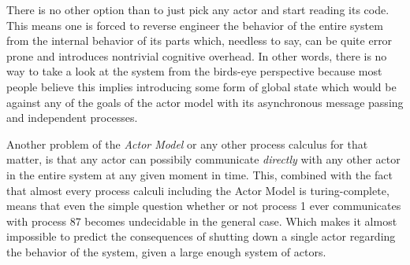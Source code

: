 There is no other option than to just pick any actor and start
reading its code. This means one is forced to reverse engineer the
behavior of the entire system from the internal behavior of its parts
which, needless to say, can be quite error prone and introduces
nontrivial cognitive overhead. In other words, there is no way to
take a look at the system from the birds-eye perspective because
most people believe this implies introducing some form of global
state which would be against any of the goals of the actor model
with its asynchronous message passing and independent processes.
\newline

Another problem of the \textit{Actor Model} or any other process
calculus for that matter, is that any actor can possibily communicate
\textit{directly} with any other actor in the entire system at any
given moment in time. This, combined with the fact that almost every
process calculi including the Actor Model is turing-complete,
means that even the simple question whether or not process 1
ever communicates with process 87 becomes undecidable in the general
case. Which makes it almost impossible to predict the consequences
of shutting down a single actor regarding the behavior of the system,
given a large enough system of actors.
